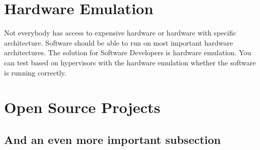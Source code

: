 \blindtext

\section{Hardware Emulation}

Not everybody has access to expensive hardware or hardware with  specific architecture. Software should be able to run on most important hardware architectures. The solution for Software Developers is hardware emulation. You can test based on hypervisors with the hardware emulation whether the software is running correctly.
\blindtext

\section{Open Source Projects}
\blindtext

\subsection{And an even more important subsection}
\blindtext

